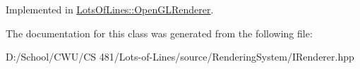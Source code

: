 Implemented in \hyperlink{class_lots_of_lines_1_1_open_g_l_renderer_a003e562c0f86b870e4fcc1f5ed0cabf0}{Lots\+Of\+Lines\+::\+Open\+G\+L\+Renderer}.



The documentation for this class was generated from the following file\+:\begin{DoxyCompactItemize}
\item 
D\+:/\+School/\+C\+W\+U/\+C\+S 481/\+Lots-\/of-\/\+Lines/source/\+Rendering\+System/I\+Renderer.\+hpp\end{DoxyCompactItemize}
